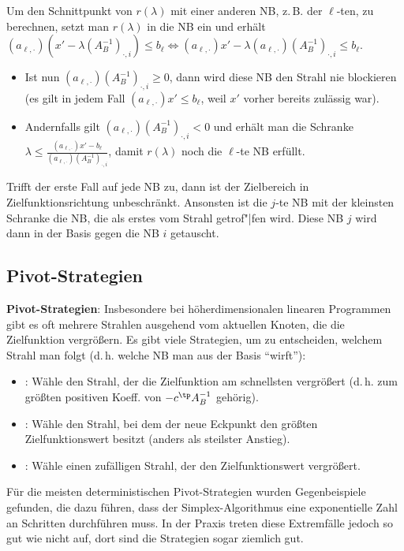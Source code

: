 Um den Schnittpunkt von $r(\lambda)$ mit einer anderen NB, z.\,B. der $\ell$-ten, zu
berechnen, setzt man $r(\lambda)$ in die NB ein und erhält
$(a_{\ell,\cdot}) (x' - \lambda (A_B^{-1})_{\cdot,i}) \le b_\ell
\iff (a_{\ell,\cdot}) x' - \lambda (a_{\ell,\cdot}) (A_B^{-1})_{\cdot,i} \le b_\ell$.
\begin{itemize}
    \item
    Ist nun $(a_{\ell,\cdot}) (A_B^{-1})_{\cdot,i} \ge 0$,
    dann wird diese NB den Strahl nie blockieren\\
    (es gilt in jedem Fall $(a_{\ell,\cdot}) x' \le b_\ell$,
    weil $x'$ vorher bereits zulässig war).
    
    \item
    Andernfalls gilt $(a_{\ell,\cdot}) (A_B^{-1})_{\cdot,i} < 0$ und erhält man die Schranke
    $\lambda \le \frac{(a_{\ell,\cdot}) x' - b_\ell}{(a_{\ell,\cdot}) (A_B^{-1})_{\cdot,i}}$,
    damit $r(\lambda)$ noch die $\ell$-te NB erfüllt.
\end{itemize}
Trifft der erste Fall auf jede NB zu, dann ist der Zielbereich in Zielfunktionsrichtung
unbeschränkt.
Ansonsten ist die $j$-te NB mit der kleinsten Schranke die NB, die als erstes vom Strahl
getrof"|fen wird.
Diese NB $j$ wird dann in der Basis gegen die NB $i$ getauscht.

\pagebreak

\subsection{%
    Pivot-Strategien%
}

\textbf{Pivot-Strategien}:
Insbesondere bei höherdimensionalen linearen Programmen gibt es oft mehrere Strahlen
ausgehend vom aktuellen Knoten, die die Zielfunktion vergrößern.
Es gibt viele Strategien, um zu entscheiden, welchem Strahl man folgt
(d.\,h. welche NB man aus der Basis "`wirft"'):
\begin{itemize}
    \item
    :
    Wähle den Strahl, der die Zielfunktion am schnellsten vergrößert
    (d.\,h. zum größten positiven Koeff. von $-c^\tp A_B^{-1}$ gehörig).
    
    \item
    :
    Wähle den Strahl, bei dem der neue Eckpunkt den größten Zielfunktionswert besitzt
    (anders als steilster Anstieg).
    
    \item
    :
    Wähle einen zufälligen Strahl, der den Zielfunktionswert vergrößert.
\end{itemize}
Für die meisten deterministischen Pivot-Strategien wurden Gegenbeispiele gefunden,
die dazu führen, dass der Simplex-Algorithmus eine exponentielle Zahl an Schritten durchführen
muss.
In der Praxis treten diese Extremfälle jedoch so gut wie nicht auf,
dort sind die Strategien sogar ziemlich gut.

